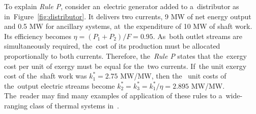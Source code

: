 \documentclass[energies,article,accept,moreauthors,pdftex]{Definitions/mdpi}
\begin{document}
To explain \emph{Rule P}, consider an~electric generator added to a~distributor as in~Figure~\ref{fig:distributor}. It delivers two currents, 9 MW of net energy output and 0.5 MW for ancillary systems, at~the expenditure of 10 MW of shaft work. Its efficiency becomes  $\eta= (P_1 + P_2)/F=0.95$. As~both outlet streams are simultaneously required, the~cost of its production must be allocated proportionally to both currents. Therefore, the~\emph{Rule P} states that the~exergy cost per unit of exergy must be equal for the~two currents. If~the unit exergy cost of the~shaft work was $k_1^*=2.75$ MW/MW, then the~ unit costs of the~output electric streams become $k_2^*=k_3^*=k_1^*/\eta=2.895$ MW/MW. The~reader may find many examples of application of these rules to a~wide-ranging class of thermal systems in~\cite{Moran1996}.
\end{document}
